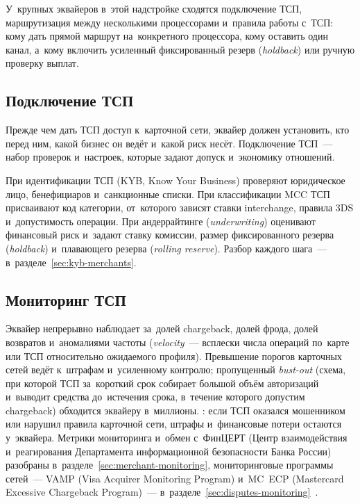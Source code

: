 У~крупных эквайеров в~этой надстройке сходятся подключение ТСП, маршрутизация
между несколькими процессорами и~правила работы с~ТСП: кому дать прямой
маршрут на~конкретного процессора, кому оставить один канал, а~кому включить
усиленный фиксированный резерв (\textit{holdback}) или ручную проверку выплат.

\subsection*{Подключение ТСП}

Прежде чем дать ТСП доступ к~карточной сети, эквайер должен установить, кто
перед ним, какой бизнес он ведёт и~какой риск несёт. Подключение ТСП~--- набор
проверок и~настроек, которые задают допуск и~экономику отношений.

При идентификации ТСП (KYB, Know Your Business) проверяют юридическое лицо,
бенефициаров и~санкционные списки. При классификации MCC ТСП присваивают код
категории, от~которого зависят ставки interchange, правила 3DS и~допустимость
операции. При андеррайтинге (\textit{underwriting}) оценивают финансовый риск и~задают ставку
комиссии, размер фиксированного резерва (\textit{holdback}) и~плавающего
резерва (\textit{rolling reserve}). Разбор каждого шага~---
в~разделе~\ref{sec:kyb-merchants}.

\subsection*{Мониторинг ТСП}

Эквайер непрерывно наблюдает за~долей chargeback, долей фрода, долей возвратов
и~аномалиями частоты (\textit{velocity}~--- всплески числа операций по~карте
или ТСП относительно ожидаемого профиля). Превышение порогов карточных сетей
ведёт к~штрафам и~усиленному контролю; пропущенный \textit{bust-out} (схема,
  при которой ТСП за~короткий срок собирает большой объём авторизаций
  и~выводит средства
до~истечения срока, в~течение которого допустим chargeback) обходится эквайеру
в~миллионы. : если ТСП оказался
мошенником или нарушил правила карточной сети, штрафы и~финансовые потери
остаются у~эквайера. Метрики мониторинга и~обмен с~ФинЦЕРТ (Центр взаимодействия
  и~реагирования Департамента информационной безопасности Банка
России)~\cite{cbr-fincert-fraud-overview} разобраны
в~разделе~\ref{sec:merchant-monitoring}, мониторинговые программы сетей~---
VAMP (Visa Acquirer Monitoring Program) и~MC~ECP (Mastercard Excessive
Chargeback Program)~---
в~разделе~\ref{sec:disputes-monitoring}~\cite{visa-vamp-intro,mc-tpr}.

